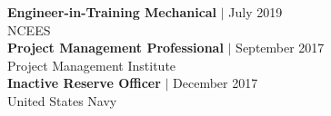 
{\sc\textbf {Engineer-in-Training Mechanical}} $\vert$ July 2019\\
{\color{gray} NCEES }\\

{\sc\textbf {Project Management Professional}} $\vert$ September 2017\\
{\color{gray} Project Management Institute }\\

{\sc\textbf {Inactive Reserve Officer}} $\vert$ December 2017\\
{\color{gray} United States Navy }\\

